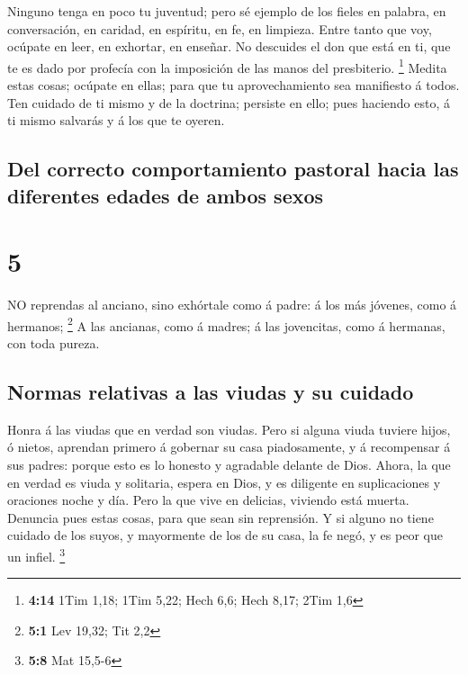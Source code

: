  Ninguno tenga en poco tu juventud; pero sé ejemplo de los
fieles en palabra, en conversación, en caridad, en espíritu, en fe, en
limpieza.  Entre tanto que voy, ocúpate en leer, en
exhortar, en enseñar.  No descuides el don que está en ti,
que te es dado por profecía con la imposición de las manos del
presbiterio. \footnote{\textbf{4:14} 1Tim 1,18; 1Tim 5,22; Hech 6,6;
  Hech 8,17; 2Tim 1,6}  Medita estas cosas; ocúpate en
ellas; para que tu aprovechamiento sea manifiesto á todos. 
Ten cuidado de ti mismo y de la doctrina; persiste en ello; pues
haciendo esto, á ti mismo salvarás y á los que te oyeren.

\hypertarget{del-correcto-comportamiento-pastoral-hacia-las-diferentes-edades-de-ambos-sexos}{%
\subsection{Del correcto comportamiento pastoral hacia las diferentes
edades de ambos
sexos}\label{del-correcto-comportamiento-pastoral-hacia-las-diferentes-edades-de-ambos-sexos}}

\hypertarget{section-4}{%
\section{5}\label{section-4}}

 NO reprendas al anciano, sino exhórtale como á padre: á los
más jóvenes, como á hermanos; \footnote{\textbf{5:1} Lev 19,32; Tit 2,2}
 A las ancianas, como á madres; á las jovencitas, como á
hermanas, con toda pureza.

\hypertarget{normas-relativas-a-las-viudas-y-su-cuidado}{%
\subsection{Normas relativas a las viudas y su
cuidado}\label{normas-relativas-a-las-viudas-y-su-cuidado}}

 Honra á las viudas que en verdad son viudas. 
Pero si alguna viuda tuviere hijos, ó nietos, aprendan primero á
gobernar su casa piadosamente, y á recompensar á sus padres: porque esto
es lo honesto y agradable delante de Dios.  Ahora, la que en
verdad es viuda y solitaria, espera en Dios, y es diligente en
suplicaciones y oraciones noche y día.  Pero la que vive en
delicias, viviendo está muerta.  Denuncia pues estas cosas,
para que sean sin reprensión.  Y si alguno no tiene cuidado
de los suyos, y mayormente de los de su casa, la fe negó, y es peor que
un infiel. \footnote{\textbf{5:8} Mat 15,5-6}

